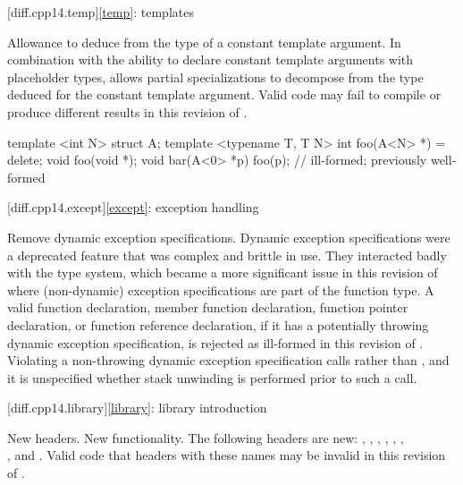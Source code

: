 [diff.cpp14.temp]{\ref*{temp}: templates}

\change
Allowance to deduce from the type of a constant template argument.
\rationale
In combination with the ability to declare
constant template arguments with placeholder types,
allows partial specializations to decompose
from the type deduced for the constant template argument.
\effect
Valid \CppXIV{} code may fail to compile
or produce different results in this revision of \Cpp{}.
\begin{example}
\begin{codeblock}
template <int N> struct A;
template <typename T, T N> int foo(A<N> *) = delete;
void foo(void *);
void bar(A<0> *p) {
  foo(p);           // ill-formed; previously well-formed
}
\end{codeblock}
\end{example}

[diff.cpp14.except]{\ref*{except}: exception handling}

\change
Remove dynamic exception specifications.
\rationale
Dynamic exception specifications were a deprecated feature
that was complex and brittle in use.
They interacted badly with the type system,
which became a more significant issue in this revision of \Cpp{}
where (non-dynamic) exception specifications are part of the function type.
\effect
A valid \CppXIV{} function declaration,
member function declaration,
function pointer declaration,
or function reference declaration,
if it has a potentially throwing dynamic exception specification,
is rejected as ill-formed in this revision of \Cpp{}.
Violating a non-throwing dynamic exception specification
calls  rather than ,
and it is unspecified whether stack unwinding is performed
prior to such a call.

[diff.cpp14.library]{\ref*{library}: library introduction}

\change
New headers.
\rationale
New functionality.
\effect
The following \Cpp{} headers are new:
,
,
,
,
,
,\\
,
and
.
Valid \CppXIV{} code that  headers with these names may be
invalid in this revision of \Cpp{}.

